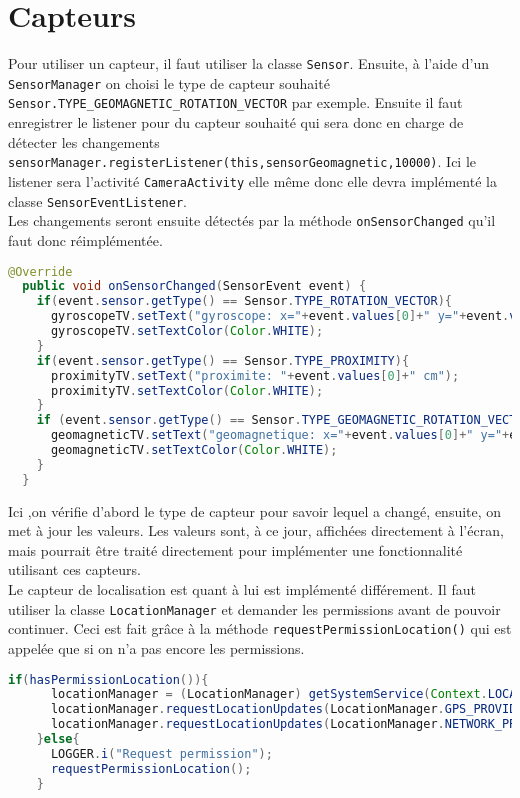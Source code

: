 \documentclass[UTF8]{EPURapport}
\begin{document}
\section{Capteurs}

Pour utiliser un capteur, il faut utiliser la classe \verb|Sensor|. Ensuite, à l'aide d'un \verb|SensorManager| on choisi le type de capteur souhaité \verb|Sensor.TYPE_GEOMAGNETIC_ROTATION_VECTOR| par exemple. Ensuite il faut enregistrer le listener pour du capteur souhaité qui sera donc en charge de détecter les changements \verb|sensorManager.registerListener(this,sensorGeomagnetic,10000)|. Ici le listener sera l'activité \verb|CameraActivity| elle même donc elle devra implémenté la classe \verb|SensorEventListener|.\\

Les changements seront ensuite détectés par la méthode \verb|onSensorChanged| qu'il faut donc réimplémentée.\\

\begin{lstlisting}[language=Java]
  @Override
  public void onSensorChanged(SensorEvent event) {
    if(event.sensor.getType() == Sensor.TYPE_ROTATION_VECTOR){
      gyroscopeTV.setText("gyroscope: x="+event.values[0]+" y="+event.values[1]+" z="+event.values[2]);
      gyroscopeTV.setTextColor(Color.WHITE);
    }
    if(event.sensor.getType() == Sensor.TYPE_PROXIMITY){
      proximityTV.setText("proximite: "+event.values[0]+" cm");
      proximityTV.setTextColor(Color.WHITE);
    }
    if (event.sensor.getType() == Sensor.TYPE_GEOMAGNETIC_ROTATION_VECTOR){
      geomagneticTV.setText("geomagnetique: x="+event.values[0]+" y="+event.values[1]+" z="+event.values[2]);
      geomagneticTV.setTextColor(Color.WHITE);
    }
  }
\end{lstlisting}

Ici ,on vérifie d'abord le type de capteur pour savoir lequel a changé, ensuite, on met à jour les valeurs. Les valeurs sont, à ce jour, affichées directement à l'écran, mais pourrait être traité directement pour implémenter une fonctionnalité utilisant ces capteurs. \\

Le capteur de localisation est quant à lui est implémenté différement. Il faut utiliser la classe \verb|LocationManager| et demander les permissions avant de pouvoir continuer. Ceci est fait grâce à la méthode \verb|requestPermissionLocation()| qui est appelée que si on n'a pas encore les permissions.

\begin{lstlisting}[language=Java]
if(hasPermissionLocation()){
      locationManager = (LocationManager) getSystemService(Context.LOCATION_SERVICE);
      locationManager.requestLocationUpdates(LocationManager.GPS_PROVIDER, 0, 0, this);
      locationManager.requestLocationUpdates(LocationManager.NETWORK_PROVIDER, 0, 0, this);
    }else{
      LOGGER.i("Request permission");
      requestPermissionLocation();
    }
\end{lstlisting}
\end{document}
